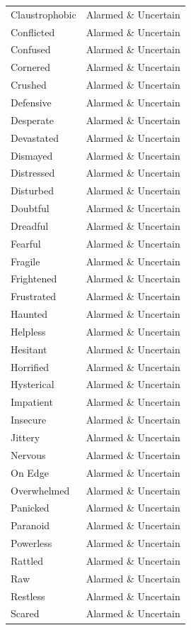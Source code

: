 \begin{longtable}{p{}p{}}
Claustrophobic & Alarmed \& Uncertain \\
Conflicted & Alarmed \& Uncertain \\
Confused & Alarmed \& Uncertain \\
Cornered & Alarmed \& Uncertain \\
Crushed & Alarmed \& Uncertain \\
Defensive & Alarmed \& Uncertain \\
Desperate & Alarmed \& Uncertain \\
Devastated & Alarmed \& Uncertain \\
Dismayed & Alarmed \& Uncertain \\
Distressed & Alarmed \& Uncertain \\
Disturbed & Alarmed \& Uncertain \\
Doubtful & Alarmed \& Uncertain \\
Dreadful & Alarmed \& Uncertain \\
Fearful & Alarmed \& Uncertain \\
Fragile & Alarmed \& Uncertain \\
Frightened & Alarmed \& Uncertain \\
Frustrated & Alarmed \& Uncertain \\
Haunted & Alarmed \& Uncertain \\
Helpless & Alarmed \& Uncertain \\
Hesitant & Alarmed \& Uncertain \\
Horrified & Alarmed \& Uncertain \\
Hysterical & Alarmed \& Uncertain \\
Impatient & Alarmed \& Uncertain \\
Insecure & Alarmed \& Uncertain \\
Jittery & Alarmed \& Uncertain \\
Nervous & Alarmed \& Uncertain \\
On Edge & Alarmed \& Uncertain \\
Overwhelmed & Alarmed \& Uncertain \\
Panicked & Alarmed \& Uncertain \\
Paranoid & Alarmed \& Uncertain \\
Powerless & Alarmed \& Uncertain \\
Rattled & Alarmed \& Uncertain \\
Raw & Alarmed \& Uncertain \\
Restless & Alarmed \& Uncertain \\
Scared & Alarmed \& Uncertain \\

\end{longtable}
